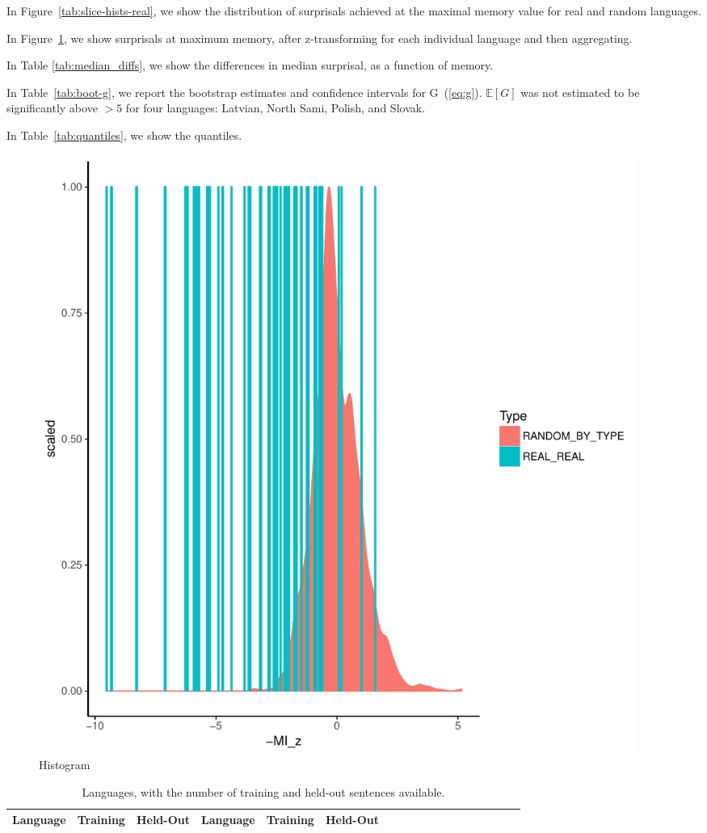 \documentclass[11pt,letterpaper]{article}
\newcommand{\E}[0]{\mathbb{E}}
\begin{document}
In Figure~\ref{tab:slice-hists-real}, we show the distribution of surprisals achieved at the maximal memory value for real and random languages.

In Figure~\ref{fig:hist-real}, we show surprisals at maximum memory, after z-transforming for each individual language and then aggregating.

In Table \ref{tab:median_diffs}, we show the differences in median surprisal, as a function of memory.


In Table~\ref{tab:boot-g}, we report the bootstrap estimates and confidence intervals for G~(\ref{eq:g}).
$\E[G]$ was not estimated to be significantly above $>5$ for four languages: Latvian, North Sami, Polish, and Slovak.


In Table~\ref{tab:quantiles}, we show the quantiles.



\begin{figure}
\includegraphics[width=0.95\textwidth]{neural/figures/full-REAL-listener-surprisal-memory-HIST_z_byMem_onlyWordForms_boundedVocab.pdf}
\caption{Histogram}\label{fig:hist-real}
\end{figure}


\begin{table}
\begin{longtable}{l|ll||l|llllllllllllll}
	Language & Training & Held-Out & 	Language & Training & Held-Out\\ \hline

\end{longtable}
	\caption{Languages, with the number of training and held-out sentences available.}\label{tab:corpora}
\end{table}
\end{document}
